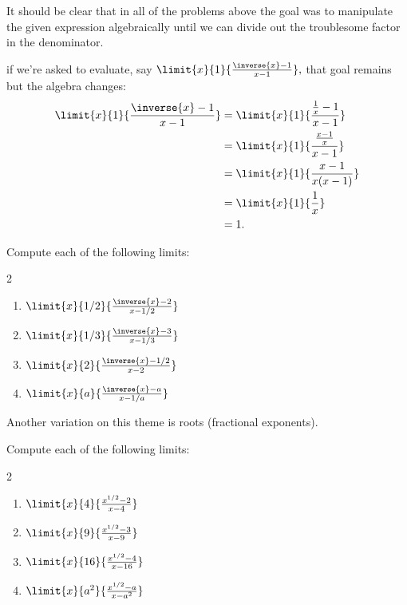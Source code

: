     It should be clear that  in all of the problems above the goal
    was to manipulate the given expression algebraically until we can
    divide out the troublesome factor in the denominator.

    if we're asked to evaluate, say
    $\limit{x}{1}{\frac{\inverse{x}-1}{x-1}},$ that goal remains but
    the algebra changes:
    \begin{align*}
      \limit{x}{1}{\frac{\inverse{x}-1}{x-1}} &=
                                                \limit{x}{1}{\frac{\frac1x-1}{x-1}} \\
                                              &=
                                                \limit{x}{1}{\frac{\frac{x-1}{x}}{x-1}} \\
                                              &=\limit{x}{1}{\frac{x-1}
                                                {x(x-1)}} \\
      &=\limit{x}{1}{\frac1x} \\
      &=1.
    \end{align*}
    \begin{embeddedproblem}{}
      Compute each of the following limits:
      \begin{multicols}{2}
        \begin{enumerate}[label={\bf{}(\alph*)}]
          \item $\limit{x}{1/2}{\frac{\inverse{x}-2}{x-1/2}}$
          \item $\limit{x}{1/3}{\frac{\inverse{x}-3}{x-1/3}}$
          \item $\limit{x}{2}{\frac{\inverse{x}-1/2}{x-2}}$
          \item $\limit{x}{a}{\frac{\inverse{x}-a}{x-1/a}}$
          \end{enumerate}
        \end{multicols}
      \end{embeddedproblem}

      Another variation on this theme is roots (fractional exponents).

      \begin{embeddedproblem}{}
      Compute each of the following limits:
      \begin{multicols}{2}
        \begin{enumerate}[label={\bf{}(\alph*)}]
          \item $\limit{x}{4}{\frac{x^{1/2}-2}{x-4}}$
          \item $\limit{x}{9}{\frac{x^{1/2}-3}{x-9}}$
          \item $\limit{x}{16}{\frac{x^{1/2}-4}{x-16}}$
          \item $\limit{x}{a^2}{\frac{x^{1/2}-a}{x-a^2}}$
          \end{enumerate}          
        \end{multicols}
      \end{embeddedproblem}

